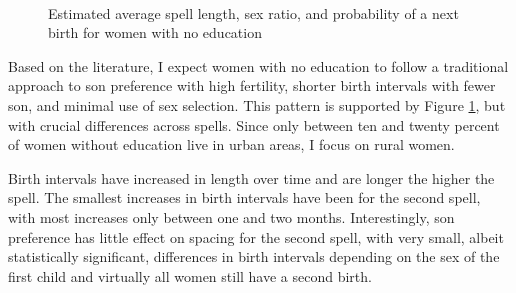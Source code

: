 \documentclass[12pt,letterpaper]{article}
\begin{document}
\captionsetup[subfigure]{captionskip=-1pt,farskip=-0.5pt}


\begin{figure}[htpb]
\centering
{}
\\
\caption{Estimated average spell length, sex ratio, and probability of 
a next birth for women with no education}
\label{fig:bootstrap_low}
\end{figure}

Based on the literature, I expect women with no education to follow a traditional approach
to son preference with high fertility, shorter birth intervals with fewer son, and  
minimal use of sex selection.
This pattern is supported by Figure \ref{fig:bootstrap_low}, but with crucial differences 
across spells.
Since only between ten and twenty percent of women without education live in urban areas, 
I focus on rural women.

Birth intervals have increased in length over time and are longer the higher the spell.
The smallest increases in birth intervals have been for the second spell, with most 
increases only between one and two months.
Interestingly, son preference has little effect on spacing for the second spell, with 
very small, albeit statistically significant, differences in birth intervals depending on 
the sex of the first child and virtually all women still have a second birth.
\end{document}
